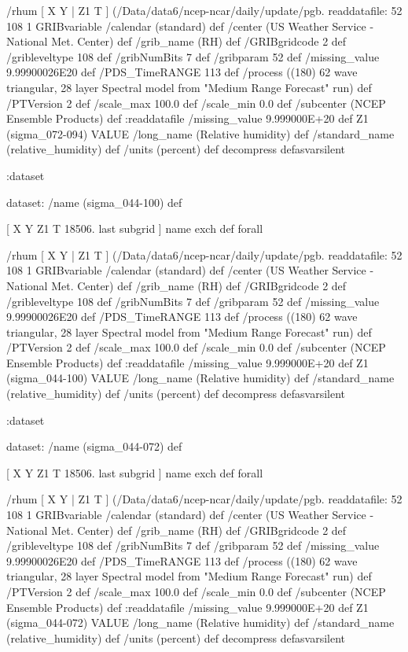\begin{ingrid}
  /rhum { [ X Y | Z1 T ] (/Data/data6/ncep-ncar/daily/update/pgb.%
  readdatafile:
  52 108 1 GRIBvariable
  /calendar (standard) def
  /center (US Weather Service - National Met. Center) def
  /grib_name (RH) def
  /GRIBgridcode 2 def
  /gribleveltype 108 def
  /gribNumBits 7 def
  /gribparam 52 def
  /missing_value 9.99900026E20 def
  /PDS_TimeRANGE 113 def
  /process ((180) 62 wave triangular, 28 layer Spectral model from "Medium Range Forecast" run) def
  /PTVersion 2 def
  /scale_max 100.0 def
  /scale_min 0.0 def
  /subcenter (NCEP Ensemble Products) def
  :readdatafile
  /missing_value 9.999000E+20 def
  Z1 (sigma_072-094) VALUE
  /long_name (Relative humidity) def
  /standard_name (relative_humidity) def
  /units (percent) def
  decompress
  } defasvarsilent

 :dataset

 dataset: /name (sigma_044-100) def 

  [ X Y Z1 T 18506. last subgrid ] { name exch def } forall

  /rhum { [ X Y | Z1 T ] (/Data/data6/ncep-ncar/daily/update/pgb.%
  readdatafile:
  52 108 1 GRIBvariable
  /calendar (standard) def
  /center (US Weather Service - National Met. Center) def
  /grib_name (RH) def
  /GRIBgridcode 2 def
  /gribleveltype 108 def
  /gribNumBits 7 def
  /gribparam 52 def
  /missing_value 9.99900026E20 def
  /PDS_TimeRANGE 113 def
  /process ((180) 62 wave triangular, 28 layer Spectral model from "Medium Range Forecast" run) def
  /PTVersion 2 def
  /scale_max 100.0 def
  /scale_min 0.0 def
  /subcenter (NCEP Ensemble Products) def
  :readdatafile
  /missing_value 9.999000E+20 def
  Z1 (sigma_044-100) VALUE
  /long_name (Relative humidity) def
  /standard_name (relative_humidity) def
  /units (percent) def
  decompress
  } defasvarsilent

 :dataset

 dataset: /name (sigma_044-072) def 

  [ X Y Z1 T 18506. last subgrid ] { name exch def } forall

  /rhum { [ X Y | Z1 T ] (/Data/data6/ncep-ncar/daily/update/pgb.%
  readdatafile:
  52 108 1 GRIBvariable
  /calendar (standard) def
  /center (US Weather Service - National Met. Center) def
  /grib_name (RH) def
  /GRIBgridcode 2 def
  /gribleveltype 108 def
  /gribNumBits 7 def
  /gribparam 52 def
  /missing_value 9.99900026E20 def
  /PDS_TimeRANGE 113 def
  /process ((180) 62 wave triangular, 28 layer Spectral model from "Medium Range Forecast" run) def
  /PTVersion 2 def
  /scale_max 100.0 def
  /scale_min 0.0 def
  /subcenter (NCEP Ensemble Products) def
  :readdatafile
  /missing_value 9.999000E+20 def
  Z1 (sigma_044-072) VALUE
  /long_name (Relative humidity) def
  /standard_name (relative_humidity) def
  /units (percent) def
  decompress
  } defasvarsilent


\end{ingrid}
